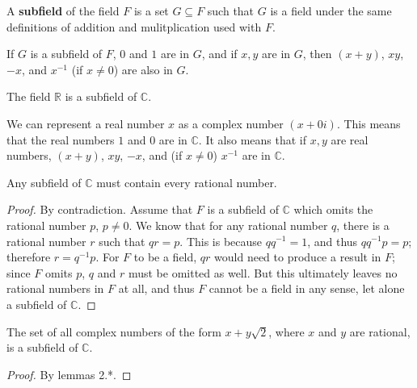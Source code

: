 \documentclass[12pt]{article}
\begin{document}
\begin{defn}
  A \textbf{subfield} of the field $F$ is a set $G \subseteq F$
  such that $G$ is a field under the same definitions of addition
  and mulitplication used with $F$.
\end{defn}

\begin{comm}
  If $G$ is a subfield of $F$, $0$ and $1$ are in $G$, and if $x,
  y$ are in $G$, then $(x + y)$, $xy$, $-x$, and $x^{-1}$ (if
  $x \neq 0$) are also in $G$.
\end{comm}

\begin{exm}
  The field $\mathbb{R}$ is a subfield of $\mathbb{C}$.

  We can represent a real number $x$ as a complex number $(x +
  0i)$. This means that the real numbers $1$ and $0$ are in
  $\mathbb{C}$. It also means that if $x, y$ are real numbers,
  $(x + y)$, $xy$, $-x$, and (if $x \neq 0$) $x^{-1}$ are in
  $\mathbb{C}$.
\end{exm}

\begin{thm}
  Any subfield of $\mathbb{C}$ must contain every rational
  number.
  \begin{proof}
    By contradiction. Assume that $F$ is a subfield of
    $\mathbb{C}$ which omits the rational number $p$, $p \neq 0$.
    We know that for any rational number $q$, there is a rational
    number $r$ such that $qr = p$. This is because $qq^{-1} = 1$,
    and thus $qq^{-1}p = p$; therefore $r = q^{-1}p$. For $F$ to
    be a field, $qr$ would need to produce a result in $F$; since
    $F$ omits $p$, $q$ and $r$ must be omitted as well. But this
    ultimately leaves no rational numbers in $F$ at all, and thus
    $F$ cannot be a field in any sense, let alone a subfield of
    $\mathbb{C}$.
  \end{proof}
\end{thm}

\begin{thm}
  The set of all complex numbers of the form $x + y\sqrt{2}$,
  where $x$ and $y$ are rational, is a subfield of $\mathbb{C}$.

  \begin{proof}
    By lemmas 2.*.
  \end{proof}
\end{thm}
\end{document}
